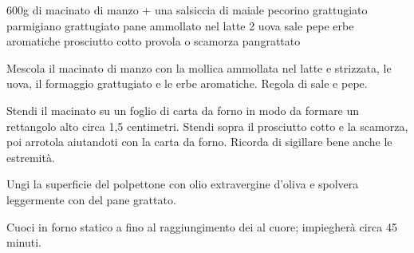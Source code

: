 \begin{ingreds}
	600g di macinato di manzo + una salsiccia di maiale
	pecorino grattugiato
	parmigiano grattugiato
	pane ammollato nel latte
	2 uova
	sale
	pepe
	erbe aromatiche
	prosciutto cotto
	provola o scamorza
	pangrattato
\end{ingreds}

\begin{method}
Mescola il macinato di manzo con la mollica ammollata nel latte e strizzata, le uova, il formaggio grattugiato e le erbe aromatiche. Regola di sale e pepe.

Stendi il macinato su un foglio di carta da forno in modo da formare un rettangolo alto circa 1,5 centimetri. Stendi sopra il prosciutto cotto e la scamorza, poi arrotola aiutandoti con la carta da forno. Ricorda di sigillare bene anche le estremità.

Ungi la superficie del polpettone con olio extravergine d'oliva e spolvera leggermente con del pane grattato.

Cuoci in forno statico a  fino al raggiungimento dei  al cuore; impiegherà circa 45 minuti.
\end {method}


